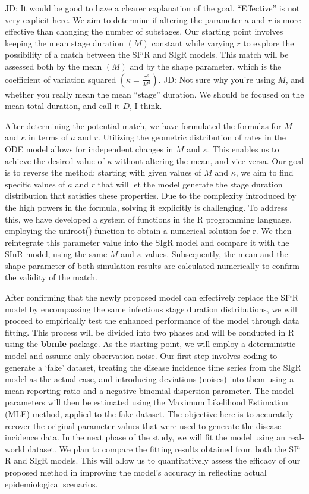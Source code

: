 \documentclass[12pt]{article}
\begin{document}
JD: It would be good to have a clearer explanation of the goal. “Effective” is not very explicit here.
We aim to determine if altering the parameter $a$ and $r$ is more effective than changing the number of substages. Our starting point involves keeping the mean stage duration $(M)$ constant while varying $r$ to explore the possibility of a match between the SI$^n$R and SIgR models. This match will be assessed both by the mean $(M)$ and by the shape parameter, which is the coefficient of variation squared $(\kappa = \frac{\sigma^2}{M^2})$.
JD: Not sure why you're using $M$, and whether you really mean the mean “stage” duration. We should be focused on the mean total duration, and call it $D$, I think.

After determining the potential match, we have formulated the formulas for $M$ and $\kappa$ in terms of $a$ and $r$. Utilizing the geometric distribution of rates in the ODE model allows for independent changes in $M$ and $\kappa$. This enables us to achieve the desired value of $\kappa$ without altering the mean, and vice versa. Our goal is to reverse the method: starting with given values of $M$ and $\kappa$, we aim to find specific values of $a$ and $r$ that will let the model generate the stage duration distribution that satisfies these properties. Due to the complexity introduced by the high powers in the formula, solving it explicitly is challenging. To address this, we have developed a system of functions in the R programming language, employing the uniroot() function to obtain a numerical solution for r. We then reintegrate this parameter value into the SIgR model and compare it with the SInR model, using the same $M$ and $\kappa$ values. Subsequently, the mean and the shape parameter of both simulation results are calculated numerically to confirm the validity of the match.

After confirming that the newly proposed model can effectively replace the SI$^n$R model by encompassing the same infectious stage duration distributions, we will proceed to empirically test the enhanced performance of the model through data fitting. This process will be divided into two phases and will be conducted in R using the \textbf{bbmle} package. As the starting point, we will employ a deterministic model and assume only observation noise. Our first step involves coding to generate a `fake' dataset, treating the disease incidence time series from the SIgR model as the actual case, and introducing deviations (noises) into them using a mean reporting ratio and a negative binomial dispersion parameter. The model parameters will then be estimated using the Maximum Likelihood Estimation (MLE) method, applied to the fake dataset. The objective here is to accurately recover the original parameter values that were used to generate the disease incidence data. In the next phase of the study, we will fit the model using an real-world dataset. We plan to compare the fitting results obtained from both the SI$^n$R and SIgR models. This will allow us to quantitatively assess the efficacy of our proposed method in improving the model's accuracy in reflecting actual epidemiological scenarios.
\end{document}
